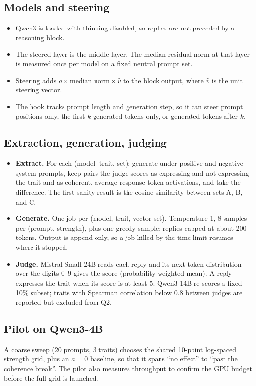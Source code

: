 \documentclass[11pt]{article}
\begin{document}
\subsection{Models and steering}
\begin{itemize}
  \item Qwen3 is loaded with thinking disabled, so replies are not preceded by
        a reasoning block.
  \item The steered layer is the middle layer. The median residual norm at that
        layer is measured once per model on a fixed neutral prompt set.
  \item Steering adds $a \times \text{median norm} \times \hat{v}$ to the block
        output, where $\hat{v}$ is the unit steering vector.
  \item The hook tracks prompt length and generation step, so it can steer
        prompt positions only, the first $k$ generated tokens only, or
        generated tokens after $k$.
\end{itemize}

\subsection{Extraction, generation, judging}
\begin{itemize}
  \item \textbf{Extract.} For each (model, trait, set): generate under positive
        and negative system prompts, keep pairs the judge scores as expressing
        and not expressing the trait and as coherent, average response-token
        activations, and take the difference. The first sanity result is the
        cosine similarity between sets A, B, and C.
  \item \textbf{Generate.} One job per (model, trait, vector set). Temperature
        1, 8 samples per (prompt, strength), plus one greedy sample; replies
        capped at about 200 tokens. Output is append-only, so a job killed by
        the time limit resumes where it stopped.
  \item \textbf{Judge.} Mistral-Small-24B reads each reply and its next-token
        distribution over the digits 0--9 gives the score (probability-weighted
        mean). A reply expresses the trait when its score is at least 5.
        Qwen3-14B re-scores a fixed 10\% subset; traits with Spearman
        correlation below 0.8 between judges are reported but excluded from Q2.
\end{itemize}

\subsection{Pilot on Qwen3-4B}
A coarse sweep (20 prompts, 3 traits) chooses the shared 10-point log-spaced
strength grid, plus an $a = 0$ baseline, so that it spans ``no effect'' to
``past the coherence break''. The pilot also measures throughput to confirm the
GPU budget before the full grid is launched.
\end{document}
